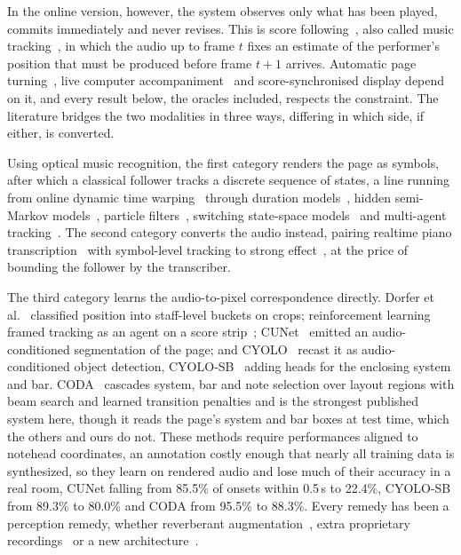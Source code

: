 \documentclass{article}
\begin{document}
In the online version, however, the system observes only what has been played,
commits immediately and never revises. This is score
following~\cite{orio2003}, also called music tracking~\cite{arzt2010}, in which
the audio up to frame $t$ fixes an estimate of the performer's position that
must be produced before frame $t+1$ arrives. Automatic page
turning~\cite{arzt2008}, live computer
accompaniment~\cite{dannenberg1984,raphael2010} and score-synchronised display
depend on it, and every result below, the oracles included, respects the
constraint. The literature bridges the two modalities in
three ways, differing in which side, if either, is converted.

Using optical music recognition, the first category renders the page as
symbols, after which a classical follower tracks a discrete sequence of states,
a line running from online dynamic time warping~\cite{dixon2005match} through
duration models~\cite{cont2010}, hidden semi-Markov models~\cite{nakamura2015},
particle filters~\cite{korzeniowski2013}, switching state-space
models~\cite{jiang2020} and multi-agent tracking~\cite{arzt2010}. The second
category converts the audio instead, pairing realtime piano
transcription~\cite{kong2021} with symbol-level tracking to strong
effect~\cite{peter2025}, at the price of bounding the follower by the
transcriber.

The third category learns the audio-to-pixel correspondence directly. Dorfer et al.~\cite{dorfer2016} classified position into
staff-level buckets on crops; reinforcement learning framed tracking as an
agent on a score strip~\cite{dorfer2018rl,henkel2019rl};
CUNet~\cite{henkel2020cunet} emitted an audio-conditioned segmentation of the
page; and CYOLO~\cite{henkel2021eusipco} recast it as audio-conditioned object
detection, CYOLO-SB~\cite{henkel2021frontiers} adding heads for the enclosing
system and bar. CODA~\cite{yang2026coda} cascades system, bar and note
selection over layout regions with beam search and learned transition penalties
and is the strongest published system here, though it reads the page's system
and bar boxes at test time, which the others and ours do not. These methods
require performances aligned to notehead coordinates, an annotation costly
enough that nearly all training data is synthesized, so they learn on rendered
audio and lose much of their accuracy in a real room, CUNet falling
from 85.5\% of onsets within 0.5\,s to 22.4\%, CYOLO-SB from 89.3\% to 80.0\%
and CODA from 95.5\% to 88.3\%. Every remedy has been a perception remedy, whether reverberant augmentation~\cite{henkel2021eusipco}, extra
proprietary recordings~\cite{henkel2021frontiers} or a new
architecture~\cite{yang2026coda}.
\end{document}
